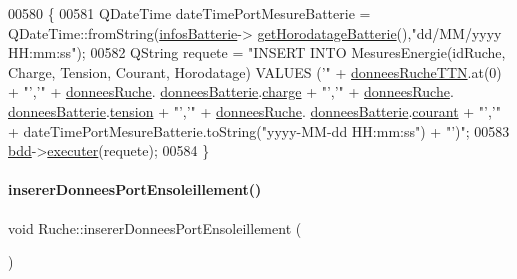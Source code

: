 \begin{DoxyCode}
00580 \{
00581     QDateTime dateTimePortMesureBatterie = QDateTime::fromString(\hyperlink{class_ruche_af34340e456aff54c8d1ec433fdbe0740}{infosBatterie}->
      \hyperlink{class_infos_batterie_aeac9a7bcd953444f4f2302d7949c74ef}{getHorodatageBatterie}(),\textcolor{stringliteral}{"dd/MM/yyyy HH:mm:ss"});
00582     QString requete = \textcolor{stringliteral}{"INSERT INTO MesuresEnergie(idRuche, Charge, Tension, Courant, Horodatage) VALUES ('"}
       + \hyperlink{class_ruche_a4556832042641c08a6ef2ab9d80d771e}{donneesRucheTTN}.at(0) + \textcolor{stringliteral}{"','"}  + \hyperlink{class_ruche_a1526bfa78f03e0710ad16f880a40c15f}{donneesRuche}.
      \hyperlink{struct_donnees_ruche_a67dc57b9568529e595a5a31e93eef703}{donneesBatterie}.\hyperlink{struct_donnees_batterie_a4d3cf76cf1722835a6449bc4a29e761b}{charge} + \textcolor{stringliteral}{"','"} + \hyperlink{class_ruche_a1526bfa78f03e0710ad16f880a40c15f}{donneesRuche}.
      \hyperlink{struct_donnees_ruche_a67dc57b9568529e595a5a31e93eef703}{donneesBatterie}.\hyperlink{struct_donnees_batterie_a1394510ba159a846820452e9e333f38b}{tension} + \textcolor{stringliteral}{"','"} + \hyperlink{class_ruche_a1526bfa78f03e0710ad16f880a40c15f}{donneesRuche}.
      \hyperlink{struct_donnees_ruche_a67dc57b9568529e595a5a31e93eef703}{donneesBatterie}.\hyperlink{struct_donnees_batterie_a7a996ea5eacd6839a8a34dbbe48eb59a}{courant} + \textcolor{stringliteral}{"','"} + dateTimePortMesureBatterie.toString(\textcolor{stringliteral}{"yyyy-MM-dd 
       HH:mm:ss"}) + \textcolor{stringliteral}{"')"};
00583     \hyperlink{class_ruche_a8577fdedabdecd98652e338e83bb3b65}{bdd}->\hyperlink{class_base_de_donnees_aa8de5f8f8bb17edc43f5c0ee33712081}{executer}(requete);
00584 \}
\end{DoxyCode}
\mbox{\label{class_ruche_ad21de5f7d48195be0658f52c55f34183}} 
\paragraph{\texorpdfstring{inserer\+Donnees\+Port\+Ensoleillement()}{insererDonneesPortEnsoleillement()}}
{\footnotesize\ttfamily void Ruche\+::inserer\+Donnees\+Port\+Ensoleillement (\begin{DoxyParamCaption}{ }\end{DoxyParamCaption})\hspace{0.3cm}{\ttfamily [private]}}



